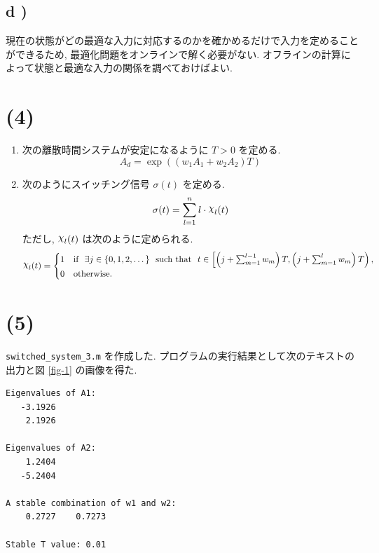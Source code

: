 \documentclass[10pt, fleqn, dvipdfmx]{article}
\DeclareRobustCommand{\rchi}{{\mathpalette\irchi\relax}}
\newcommand{\irchi}[2]{\raisebox{\depth}{$#1\chi$}}
\begin{document}
\subsection*{d )}

現在の状態がどの最適な入力に対応するのかを確かめるだけで入力を定めることができるため,
最適化問題をオンラインで解く必要がない.
オフラインの計算によって状態と最適な入力の関係を調べておけばよい.

\section*{(4)}

\begin{enumerate}
	\item 次の離散時間システムが安定になるように $T > 0$ を定める.
	      \begin{equation}
		      A_d = \exp \left( \left( w_1 A_1 + w_2 A_2 \right) T \right)
	      \end{equation}
	\item 次のようにスイッチング信号 $\sigma(t)$ を定める.
	      \begin{equation}
		      \sigma (t) = \sum_{l=1}^n l \cdot \rchi_{l} (t)
	      \end{equation}
	      ただし, $\rchi_{l} (t)$ は次のように定められる.
	      \begin{equation}
		      \rchi_{l} (t) = \begin{cases}
			      1 & \text{if} ~~
			      \exists j \in \{ 0, 1, 2, \dots \} ~~
			      \text{such that} ~~ t \in \left[ \left( j + \sum_{m=1}^{l-1} w_m \right) T, \left( j + \sum_{m=1}^l w_m \right) T \right), \\
			      0 & \text{otherwise}.
		      \end{cases}
	      \end{equation}
\end{enumerate}

\section*{(5)}

\texttt{switched\_system\_3.m} を作成した.
プログラムの実行結果として次のテキストの出力と図 \ref{fig-1} の画像を得た.

\begin{lstlisting}
Eigenvalues of A1:
   -3.1926
    2.1926

Eigenvalues of A2:
    1.2404
   -5.2404

A stable combination of w1 and w2:
    0.2727    0.7273

Stable T value: 0.01
\end{lstlisting}
\end{document}

